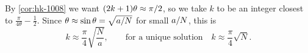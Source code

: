 By \cref{cor:hk-1008} we want $(2k+1)\theta \approx \pi/2$, so we take $k$ to be an integer
closest to $\frac{\pi}{4\theta} - \frac{1}{2}$. Since $\theta \approx \sin\theta = \sqrt{a/N}$
for small $a/N$, this is
\[k \approx \frac{\pi}{4}\sqrt{\frac{N}{a}}, \qquad \text{for a unique solution} \quad k \approx \frac{\pi}{4}\sqrt{N}.\]

\begin{exercisebox}
%

\end{exercisebox}
